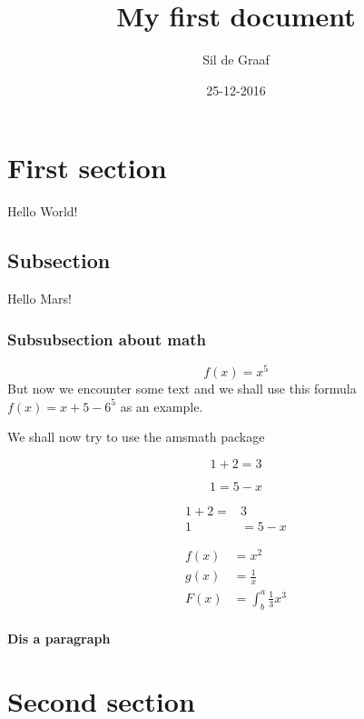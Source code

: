 \documentclass{article}
\title{My first document}
\date{25-12-2016}
\author{Sil de Graaf}
\begin{document}
	\tableofcontents
	\newpage

	\maketitle
	\newpage

	\section{First section}
	Hello World!

	\subsection{Subsection}
	
	Hello Mars!

	\subsubsection{Subsubsection about math}
		\begin{equation}
			f(x) = x^5
		\end{equation}
		But now we encounter some text and we shall use this formula $f(x) = x + 5 - 6^5$ as an example.

		We shall now try to use the amsmath package

		\begin{equation*}
			1 + 2 = 3
		\end{equation*}

		\begin{equation*}
			1 = 5 - x
		\end{equation*}

		\begin{align*}
			1 + 2  = & 3 \\
			1 & = 5 - x
		\end{align*}

		\begin{align*}
			f(x) &= x^2\\
			g(x) &= \frac{1}{x}\\
			F(x) &= \int^a_b \frac{1}{3}x^3
		\end{align*} 

	\paragraph{Dis a paragraph}

	\section{Second section}
\end{document}
